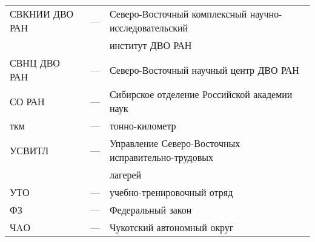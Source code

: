 \begin{changemargin}{-1.5cm}{-1cm}
\begin{tabular}{l c l}
  СВКНИИ ДВО РАН & --- & Северо-Восточный комплексный научно-исследовательский \\ & &
  институт ДВО РАН\\
  СВНЦ ДВО РАН & --- & Северо-Восточный научный центр ДВО РАН \\
  СО РАН & --- & Сибирское отделение Российской академии наук \medskip\\
  ткм & --- & тонно-километр \medskip \\
  УСВИТЛ & --- & Управление Северо-Восточных исправительно-трудовых\\ & & лагерей \\
  УТО & --- & учебно-тренировочный отряд \medskip \\
  ФЗ & --- & Федеральный закон \medskip \\
  ЧAО & --- & Чукотский автономный округ

\end{tabular}
\end{changemargin}
\thispagestyle{empty}
